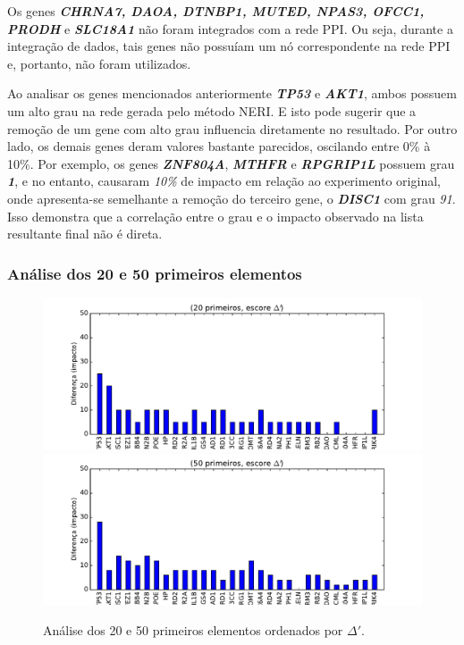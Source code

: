 Os genes \textbf{\textit{CHRNA7, DAOA, DTNBP1, MUTED, NPAS3, OFCC1, PRODH}} e \textbf{\textit{SLC18A1}} não foram integrados com a rede PPI.
Ou seja, durante a integração de dados, tais genes não possuíam um nó correspondente na rede PPI e, portanto, não foram utilizados.

Ao analisar os genes mencionados anteriormente \textbf{\textit{TP53}} e \textbf{\textit{AKT1}}, ambos possuem um alto grau na rede gerada pelo método NERI.
E isto pode sugerir que a remoção de um gene com alto grau influencia diretamente no resultado.
%
Por outro lado, os demais genes deram valores bastante parecidos, oscilando entre 0\% à 10\%.
Por exemplo, os genes \textsl{\textbf{ZNF804A}}, \textsl{\textbf{MTHFR}} e \textsl{\textbf{RPGRIP1L}} possuem grau \textsl{\textbf{1}}, e no entanto, causaram \textsl{10\%} de impacto em relação ao experimento original, onde apresenta-se semelhante a remoção do terceiro gene, o \textsl{\textbf{DISC1}} com grau \textsl{91}.
Isso demonstra que a correlação entre o grau e o impacto observado na lista resultante final não é direta. 
%

%
\subsubsection{Análise dos 20 e 50 primeiros elementos}
%
\begin{figure}[ht!]
\includegraphics[width=1\textwidth]{Images/analyses/fig_LOO_S_20.pdf}
\includegraphics[width=1\textwidth]{Images/analyses/fig_LOO_S_50.pdf}
\caption {Análise dos 20 e 50 primeiros elementos ordenados por $\Delta'$.
\label{fig_LOO_S_20-50}}
\end{figure}
%

